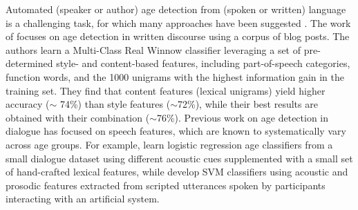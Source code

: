 Automated (speaker or author) age detection from (spoken or written) language is a challenging task, for which many approaches have been suggested \citep{nguyen-etal-2011-author}. The work of \citet{schler2006effects} focuses on age detection in written discourse using a corpus of blog posts. The authors learn a Multi-Class Real Winnow classifier leveraging a set of pre-determined style- and content-based features, including part-of-speech categories, function words, and the 1000 unigrams with the highest information gain in the training set. They find that content features (lexical unigrams) yield higher accuracy ($\sim$ 74\%) than style features ($\sim$72\%), while their best results are obtained with their combination ($\sim$76\%).
Previous work on age detection in dialogue has focused on speech features, which are known to systematically vary across age groups. For example,  \citet{wolters2009age} learn logistic regression age classifiers from a small dialogue dataset %
using different acoustic cues supplemented with a small set of hand-crafted lexical features, while \citet{li2013automatic} develop SVM classifiers using acoustic and prosodic features extracted from scripted utterances spoken by participants interacting with an artificial system. 

